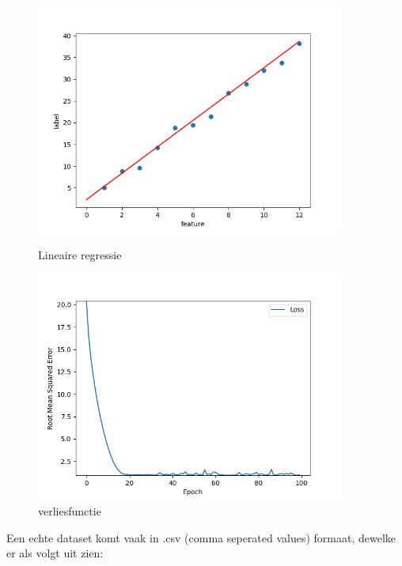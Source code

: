 \documentclass[10pt,a4paper,twoside]{article}
\begin{document}
\begin{figure}
    \centering
    \begin{minipage}{0.45\textwidth}
        \centering
        \includegraphics[width=0.9\textwidth]{LinearRegression.png}
        \caption{Lineaire regressie}
    \end{minipage}\hfill
    \begin{minipage}{0.45\textwidth}
        \centering
        \includegraphics[width=0.9\textwidth]{LinearRegressionCost.png}
	\caption{verliesfunctie}
	\label{verliesfunctie}
    \end{minipage}
\end{figure}
Een echte dataset komt vaak in .csv (comma seperated values) formaat, dewelke er als volgt uit zien:
\\\\
\end{document}
